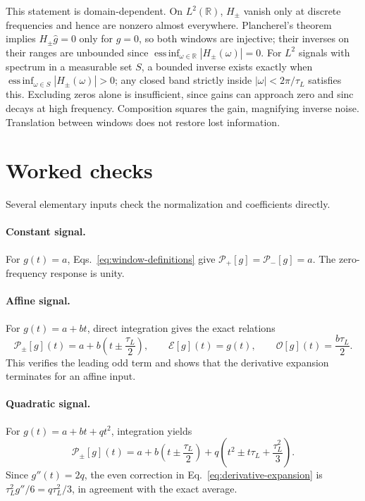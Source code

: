 \documentclass[12pt]{article}
\begin{document}
This statement is domain-dependent. On $L^2(\mathbb{R})$, $H_{\pm}$ vanish only at discrete frequencies and hence are nonzero almost everywhere. Plancherel's theorem implies $H_{\pm}\widehat{g}=0$ only for $g=0$, so both windows are injective; their inverses on their ranges are unbounded since $\operatorname*{ess\,inf}_{\omega\in\mathbb{R}}|H_{\pm}(\omega)|=0$. For $L^2$ signals with spectrum in a measurable set $S$, a bounded inverse exists exactly when $\operatorname*{ess\,inf}_{\omega\in S}|H_{\pm}(\omega)|>0$; any closed band strictly inside $|\omega|<2\pi/\tau_L$ satisfies this. Excluding zeros alone is insufficient, since gains can approach zero and sinc decays at high frequency. Composition squares the gain, magnifying inverse noise. Translation between windows does not restore lost information.

\section{Worked checks}

Several elementary inputs check the normalization and coefficients directly.

\paragraph{Constant signal.}
For $g(t)=a$, Eqs.~\eqref{eq:window-definitions} give $\mathcal{P}_{+}[g]=\mathcal{P}_{-}[g]=a$. The zero-frequency response is unity.

\paragraph{Affine signal.}
For $g(t)=a+bt$, direct integration gives the exact relations
\begin{equation}
  \mathcal{P}_{\pm}[g](t)=a+b\left(t\pm\frac{\tau_L}{2}\right),
  \qquad
  \mathcal{E}[g](t)=g(t),
  \qquad
  \mathcal{O}[g](t)=\frac{b\tau_L}{2}.
  \label{eq:affine-check}
\end{equation}
This verifies the leading odd term and shows that the derivative expansion terminates for an affine input.

\paragraph{Quadratic signal.}
For $g(t)=a+bt+qt^2$, integration yields
\begin{equation}
  \mathcal{P}_{\pm}[g](t)
  =a+b\left(t\pm\frac{\tau_L}{2}\right)
   +q\left(t^2\pm t\tau_L+\frac{\tau_L^2}{3}\right).
  \label{eq:quadratic-check}
\end{equation}
Since $g''(t)=2q$, the even correction in Eq.~\eqref{eq:derivative-expansion} is $\tau_L^2g''/6=q\tau_L^2/3$, in agreement with the exact average.
\end{document}
